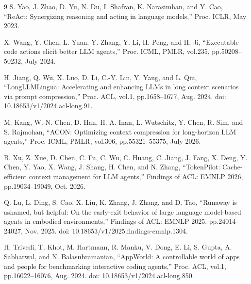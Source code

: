 \begin{thebibliography}{9}
S. Yao, J. Zhao, D. Yu, N. Du, I. Shafran, K. Narasimhan, and Y. Cao,
``ReAct: Synergizing reasoning and acting in language models,''
Proc. ICLR, May 2023.

X. Wang, Y. Chen, L. Yuan, Y. Zhang, Y. Li, H. Peng, and H. Ji,
``Executable code actions elicit better LLM agents,''
Proc. ICML, PMLR, vol.235, pp.50208--50232, July 2024.

H. Jiang, Q. Wu, X. Luo, D. Li, C.-Y. Lin, Y. Yang, and L. Qiu,
``LongLLMLingua: Accelerating and enhancing LLMs in long context scenarios via prompt compression,''
Proc. ACL, vol.1, pp.1658--1677, Aug. 2024.
doi: 10.18653/v1/2024.acl-long.91.

M. Kang, W.-N. Chen, D. Han, H. A. Inan, L. Wutschitz, Y. Chen,
R. Sim, and S. Rajmohan,
``ACON: Optimizing context compression for long-horizon LLM agents,''
Proc. ICML, PMLR, vol.306, pp.55321--55375, July 2026.

B. Xu, Z. Xue, D. Chen, C. Fu, C. Wu, C. Huang, C. Jiang, J. Fang,
X. Deng, Y. Chen, Y. Yao, X. Wang, J. Shang, H. Chen, and N. Zhang,
``TokenPilot: Cache-efficient context management for LLM agents,''
Findings of ACL: EMNLP 2026, pp.19034--19049, Oct. 2026.

Q. Lu, L. Ding, S. Cao, X. Liu, K. Zhang, J. Zhang, and D. Tao,
``Runaway is ashamed, but helpful: On the early-exit behavior of large language model-based agents in embodied environments,''
Findings of ACL: EMNLP 2025, pp.24014--24027, Nov. 2025.
doi: 10.18653/v1/2025.findings-emnlp.1304.

H. Trivedi, T. Khot, M. Hartmann, R. Manku, V. Dong, E. Li, S. Gupta,
A. Sabharwal, and N. Balasubramanian,
``AppWorld: A controllable world of apps and people for benchmarking interactive coding agents,''
Proc. ACL, vol.1, pp.16022--16076, Aug. 2024.
doi: 10.18653/v1/2024.acl-long.850.

\end{thebibliography}
